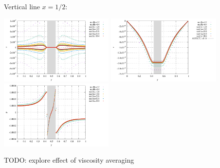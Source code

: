 Vertical line $x=1/2$:
\begin{center}
\includegraphics[width=5.7cm]{python_codes/fieldstone_158/results/exp5/profiley_u}
\includegraphics[width=5.7cm]{python_codes/fieldstone_158/results/exp5/profiley_v}
\includegraphics[width=5.7cm]{python_codes/fieldstone_158/results/exp5/profiley_p}
\end{center} 

TODO: explore effect of viscosity averaging


